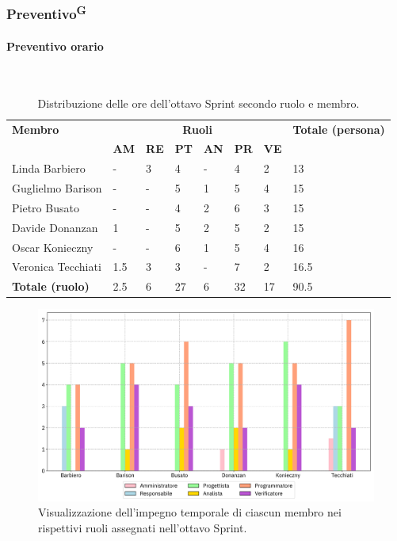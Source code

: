 \documentclass[8pt]{article}
\newcommand{\glossterm}[1]{#1\textsuperscript{G}} %
\newcommand{\subsubsubsection}[1]{\paragraph{#1}\mbox{}\\}
\begin{document}
\subsubsection{\glossterm{Preventivo}}
\subsubsubsection{Preventivo orario}
\begin{table}[ht!]
	\centering
	\begin{tabular}{p{4cm} p{1cm} p{1cm} p{1cm} p{1cm} p{1cm} p{1cm} p{3cm}}
		\toprule
        \textbf{Membro} & \multicolumn{6}{c}{\textbf{Ruoli}} & \textbf{Totale (persona)}\\
		& \textbf{AM} & \textbf{RE} & \textbf{PT} & \textbf{AN} & \textbf{PR} & \textbf{VE}\\
		\midrule
        Linda Barbiero          & -     & 3     & 4     & -     & 4     & 2     & 13 \\
        Guglielmo Barison       & -     & -     & 5     & 1     & 5     & 4 & 15 \\
        Pietro Busato           & -     & -     & 4     & 2     & 6     & 3     & 15 \\
        Davide Donanzan         & 1     & -     & 5     & 2     & 5     & 2     & 15 \\
        Oscar Konieczny         & -     & -     & 6     & 1     & 5     & 4     & 16 \\
        Veronica Tecchiati      & 1.5     & 3     & 3     & -     & 7     & 2     & 16.5 \\
        \midrule
        \textbf{Totale (ruolo)} & 2.5     & 6     & 27    & 6    & 32    & 17    & 90.5 \\
	\bottomrule
	\end{tabular}
	\caption{Distribuzione delle ore dell'ottavo Sprint secondo ruolo e membro.}
	\label{table:Distribuzione delle ore dell'ottavo Sprint secondo ruolo e membro}
\end{table}
\begin{figure}[ht!]
    \centering
    \includegraphics[width=15cm]{./images_pdp/istogramma_periodo_8.png}
    \caption{Visualizzazione dell'impegno temporale di ciascun membro nei rispettivi ruoli assegnati
    nell'ottavo Sprint.}
    \label{figure:Visualizzazione dell'impegno temporale di ciascun membro nei rispettivi ruoli
    assegnati nell'ottavo Sprint}
\end{figure}
\end{document}

